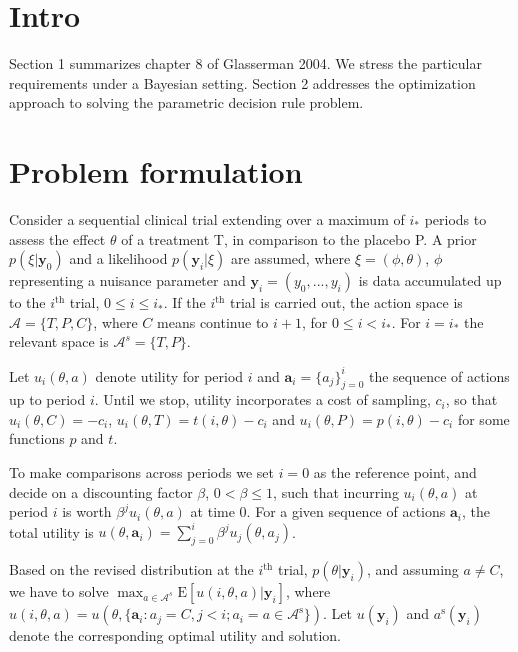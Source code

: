 \documentclass[11pt]{article}
\begin{document}

\section{Intro}
Section 1 summarizes chapter 8 of Glasserman 2004. We stress the particular requirements under a Bayesian setting. Section 2 addresses the optimization approach to solving the parametric decision rule problem.

\section{Problem formulation}
Consider a sequential clinical trial extending over a maximum of $i_*$ periods to assess the effect $\theta$ of a treatment T, in comparison to the placebo P. A prior
$\nonumber p(\xi|\mathbf{y}_0)$ and a likelihood $p(\mathbf{y}_i|\xi)$ are assumed, 
where $\xi=(\phi,\theta)$, $\phi$ representing a nuisance parameter and $\mathbf{y}_i=(y_0,...,y_i)$ is data accumulated up to the $i^{\mathrm{th}}$ trial, $0\leq i\leq i_*$. If the $i^{\mathrm{th}}$ trial is carried out, the action space is $\mathcal{A}=\{T,P,C\}$, where $C$ means continue to $i+1$, for $0\leq i<i_*$. For $i=i_*$ the relevant space is $\mathcal{A}^{s}=\{T,P\}$.

Let $u_i(\theta,a)$ denote utility for period $i$ and $\mathbf{a}_i=\{a_j\}_{j=0}^i$ the sequence of actions up to period $i$. Until we stop, utility incorporates a cost of sampling, $c_i$, so that $u_i(\theta,C)=-c_i$, $u_i(\theta,T)=t(i,\theta)-c_i$ and $u_i(\theta,P)=p(i,\theta)-c_i$ for some functions $p$ and $t$. 

To make comparisons across periods we set $i=0$ as the reference point, and decide on a discounting factor $\beta$, $0<\beta\leq 1$, such that incurring $u_i(\theta,a)$ at period $i$ is worth $\beta^ j u_i(\theta,a)$ at time $0$. For a given sequence of actions $\mathbf{a}_i$, the total utility is $u(\theta,\mathbf{a}_i)=\sum_{j=0}^i \beta^j u_j(\theta,a_j)$.

Based on the revised distribution at the $i^{\mathrm{th}}$ trial, $p(\theta|\mathbf{y}_i)$, and assuming $a \neq C$, we have to solve $\max_{a\in\mathcal{A}^s}\mathrm{E}[u(i,\theta,a)|\mathbf{y}_i]$, where 
$u(i,\theta,a)=u(\theta,\{\mathbf{a}_i:a_j=C,j<i;a_i=a\in \mathcal{A}^{\mathrm{s}}\})$. Let $u(\mathbf{y}_i)$ and $a^{\mathrm{s}}(\mathbf{y}_i)$ denote the corresponding optimal utility and solution.
\end{document}
